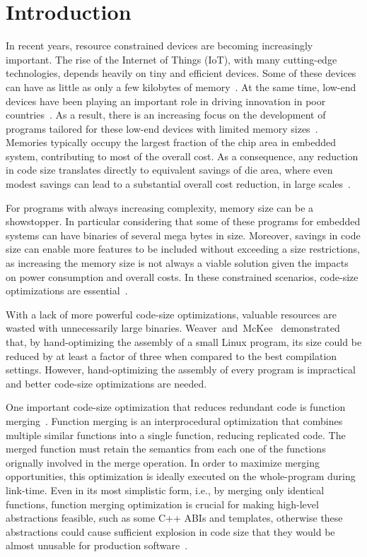 \section{Introduction}
\label{sec:introduction}


In recent years, resource constrained devices are becoming increasingly important.
The rise of the Internet of Things (IoT), with many cutting-edge technologies,
depends heavily on tiny and efficient devices.
Some of these devices can have as little as only a few kilobytes of
memory~\cite{yelamarthi17,plaza18}.
At the same time, low-end devices have been playing an important role in driving
innovation in poor countries~\cite{hart02,etzo10}.
As a result, there is an increasing focus on the development of programs
tailored for these low-end devices with limited memory sizes~\cite{androidGo,hahm16}.
Memories typically occupy the largest fraction of the chip area in embedded
system, contributing to most of the overall cost.
As a consequence, any reduction in code size translates directly to equivalent
savings of die area, where even modest savings can lead to a substantial overall
cost reduction, in large scales~\cite{edler10}.

For programs with always increasing complexity, memory size can be a showstopper.
In particular considering that some of these programs for embedded systems can
have binaries of several mega bytes in size.
Moreover, savings in code size can enable more features to be included without
exceeding a size restrictions, as increasing the memory size is not always a
viable solution given the impacts on power consumption and overall costs.
In these constrained scenarios, code-size optimizations are essential~\cite{schultz03,varma04,sehgal12,kwan12,keoh14,auler17}.

With a lack of more powerful code-size optimizations, valuable resources are
wasted with unnecessarily large binaries.
Weaver~and~McKee~\cite{weaver09} demonstrated that, by hand-optimizing the
assembly of a small Linux program, its size could be reduced by at least a factor
of three when compared to the best compilation settings.
However, hand-optimizing the assembly of every program is impractical and better
code-size optimizations are needed.

One important code-size optimization that reduces redundant code is function
merging~\cite{tallam10,edler14}.
Function merging is an interprocedural optimization that combines multiple
similar functions into a single function, reducing replicated code.
The merged function must retain the semantics from each one of the functions
orignally involved in the merge operation.
In order to maximize merging opportunities, this optimization is ideally
executed on the whole-program during link-time.
Even in its most simplistic form, i.e., by merging only identical functions,
function merging optimization is crucial for making high-level abstractions
feasible, such as some C++ ABIs and templates, otherwise these abstractions
could cause sufficient explosion in code size that they would be almost
unusable for production software~\cite{tallam10,kwan12}.

